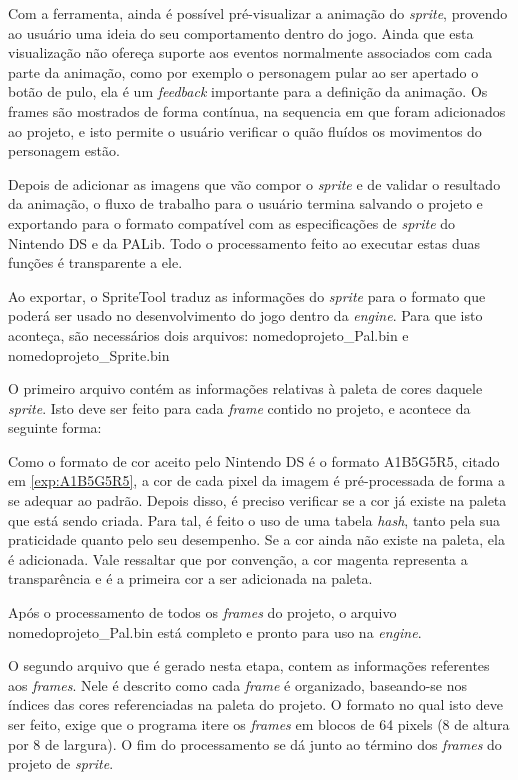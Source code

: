 \documentclass[brazil]{abnt}
\begin{document}
Com a ferramenta, ainda é possível pré-visualizar a animação do \textit{sprite}, provendo ao usuário uma ideia do seu comportamento dentro do jogo. Ainda que esta visualização não ofereça suporte aos eventos normalmente associados com cada parte da animação, como por exemplo o personagem pular ao ser apertado o botão de pulo, ela é um \textit{feedback} importante para a definição da animação. Os frames são mostrados de forma contínua, na sequencia em que foram adicionados ao projeto, e isto permite o usuário verificar o quão fluídos os movimentos do personagem estão.

Depois de adicionar as imagens que vão compor o \textit{sprite} e de validar o resultado da animação, o fluxo de trabalho para o usuário termina salvando o projeto e exportando para o formato compatível com as especificações de \textit{sprite} do Nintendo DS e da PALib. Todo o processamento feito ao executar estas duas funções é transparente a ele.

Ao exportar, o SpriteTool traduz as informações do \textit{sprite} para o formato que poderá ser usado no desenvolvimento do jogo dentro da \textit{engine}. Para que isto aconteça, são necessários dois arquivos: nomedoprojeto\_Pal.bin e nomedoprojeto\_Sprite.bin

O primeiro arquivo contém as informações relativas à paleta de cores daquele \textit{sprite}. Isto deve ser feito para cada \textit{frame} contido no projeto, e acontece da seguinte forma:

Como o formato de cor aceito pelo Nintendo DS é o formato A1B5G5R5, citado em \ref{exp:A1B5G5R5}, a cor de cada pixel da imagem é pré-processada de forma a se adequar ao padrão. Depois disso, é preciso verificar se a cor já existe na paleta que está sendo criada. Para tal, é feito o uso de uma tabela \textit{hash}, tanto pela sua praticidade quanto pelo seu desempenho. Se a cor ainda não existe na paleta, ela é adicionada. Vale ressaltar que por convenção, a cor magenta representa a transparência e é a primeira cor a ser adicionada na paleta.

Após o processamento de todos os \textit{frames} do projeto, o arquivo nomedoprojeto\_Pal.bin está completo e pronto para uso na \textit{engine}.

O segundo arquivo que é gerado nesta etapa, contem as informações referentes aos \textit{frames}. Nele é descrito como cada \textit{frame} é organizado, baseando-se nos índices das cores referenciadas na paleta do projeto. O formato no qual isto deve ser feito, exige que o programa itere os \textit{frames} em blocos de 64 pixels (8 de altura por 8 de largura). O fim do processamento se dá junto ao término dos \textit{frames} do projeto de \textit{sprite}.
\end{document}
